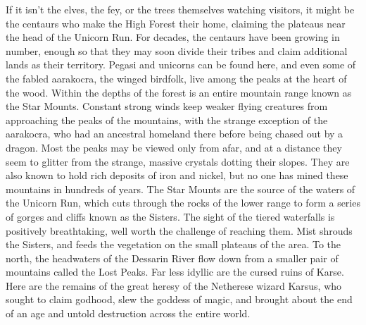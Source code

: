 \documentclass[10pt,a4paper,twoside,twocolumn,openany,bg=print,nodeprecatedcode]{dndbook}
\begin{document}
If it isn't the elves, the fey, or the trees themselves watching visitors, it might be the centaurs who make the High Forest their home, claiming the plateaus near the head of the Unicorn Run. For decades, the centaurs have been growing in number, enough so that they may soon divide their tribes and claim additional lands as their territory. Pegasi and unicorns can be found here, and even some of the fabled aarakocra, the winged birdfolk, live among the peaks at the heart of the wood.
Within the depths of the forest is an entire mountain range known as the Star Mounts. Constant strong winds keep weaker flying creatures from approaching the peaks of the mountains, with the strange exception of the aarakocra, who had an ancestral homeland there before being chased out by a dragon. Most the peaks may be viewed only from afar, and at a distance they seem to glitter from the strange, massive crystals dotting their slopes. They are also known to hold rich deposits of iron and nickel, but no one has mined these mountains in hundreds of years.
The Star Mounts are the source of the waters of the Unicorn Run, which cuts through the rocks of the lower range to form a series of gorges and cliffs known as the Sisters. The sight of the tiered waterfalls is positively breathtaking, well worth the challenge of reaching them. Mist shrouds the Sisters, and feeds the vegetation on the small plateaus of the area. To the north, the headwaters of the Dessarin River flow down from a smaller pair of mountains called the Lost Peaks.
Far less idyllic are the cursed ruins of Karse. Here are the remains of the great heresy of the Netherese wizard Karsus, who sought to claim godhood, slew the goddess of magic, and brought about the end of an age and untold destruction across the entire world.
\end{document}
